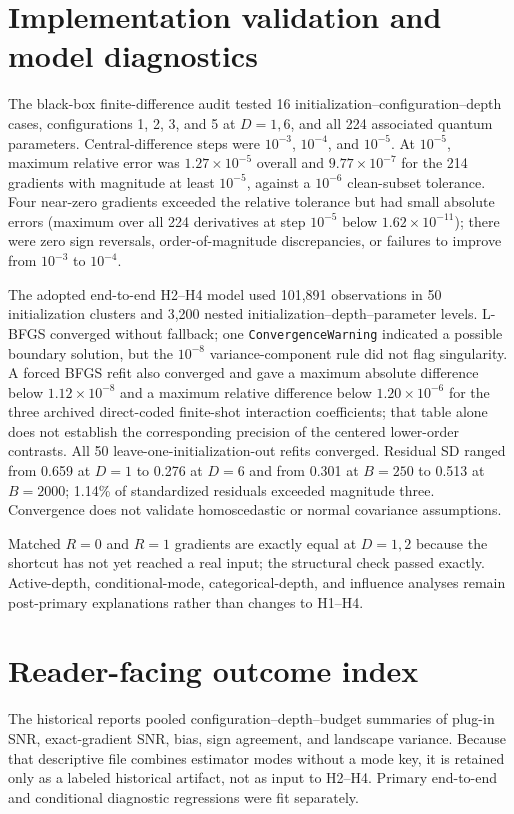 \documentclass[pdflatex,sn-basic,Numbered]{sn-jnl}
\begin{document}
\section{Implementation validation and model diagnostics}

The black-box finite-difference audit tested 16 initialization--configuration--depth cases, configurations 1, 2, 3, and 5 at $D=1,6$, and all 224 associated quantum parameters. Central-difference steps were $10^{-3}$, $10^{-4}$, and $10^{-5}$. At $10^{-5}$, maximum relative error was $1.27\times10^{-5}$ overall and $9.77\times10^{-7}$ for the 214 gradients with magnitude at least $10^{-5}$, against a $10^{-6}$ clean-subset tolerance. Four near-zero gradients exceeded the relative tolerance but had small absolute errors (maximum over all 224 derivatives at step $10^{-5}$ below $1.62\times10^{-11}$); there were zero sign reversals, order-of-magnitude discrepancies, or failures to improve from $10^{-3}$ to $10^{-4}$.

The adopted end-to-end H2--H4 model used 101,891 observations in 50 initialization clusters and 3,200 nested initialization--depth--parameter levels. L-BFGS converged without fallback; one \texttt{ConvergenceWarning} indicated a possible boundary solution, but the $10^{-8}$ variance-component rule did not flag singularity. A forced BFGS refit also converged and gave a maximum absolute difference below $1.12\times10^{-8}$ and a maximum relative difference below $1.20\times10^{-6}$ for the three archived direct-coded finite-shot interaction coefficients; that table alone does not establish the corresponding precision of the centered lower-order contrasts. All 50 leave-one-initialization-out refits converged. Residual SD ranged from 0.659 at $D=1$ to 0.276 at $D=6$ and from 0.301 at $B=250$ to 0.513 at $B=2000$; 1.14\% of standardized residuals exceeded magnitude three. Convergence does not validate homoscedastic or normal covariance assumptions.

Matched $R=0$ and $R=1$ gradients are exactly equal at $D=1,2$ because the shortcut has not yet reached a real input; the structural check passed exactly. Active-depth, conditional-mode, categorical-depth, and influence analyses remain post-primary explanations rather than changes to H1--H4.

\section{Reader-facing outcome index}

The historical  reports pooled configuration--depth--budget summaries of plug-in SNR, exact-gradient SNR, bias, sign agreement, and landscape variance. Because that descriptive file combines estimator modes without a mode key, it is retained only as a labeled historical artifact, not as input to H2--H4. Primary end-to-end and conditional diagnostic regressions were fit separately.
\end{document}
